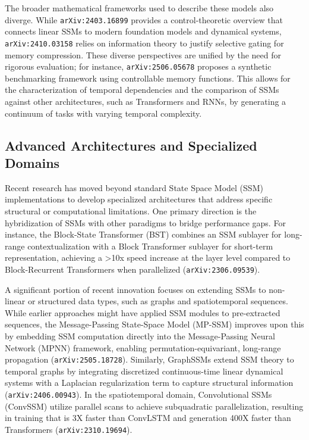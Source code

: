 \documentclass[11pt]{article}
\begin{document}
The broader mathematical frameworks used to describe these models also diverge. While \texttt{arXiv:2403.16899} provides a control-theoretic overview that connects linear SSMs to modern foundation models and dynamical systems, \texttt{arXiv:2410.03158} relies on information theory to justify selective gating for memory compression. These diverse perspectives are unified by the need for rigorous evaluation; for instance, \texttt{arXiv:2506.05678} proposes a synthetic benchmarking framework using controllable memory functions. This allows for the characterization of temporal dependencies and the comparison of SSMs against other architectures, such as Transformers and RNNs, by generating a continuum of tasks with varying temporal complexity.

\subsection{Advanced Architectures and Specialized Domains}

Recent research has moved beyond standard State Space Model (SSM) implementations to develop specialized architectures that address specific structural or computational limitations. One primary direction is the hybridization of SSMs with other paradigms to bridge performance gaps. For instance, the Block-State Transformer (BST) combines an SSM sublayer for long-range contextualization with a Block Transformer sublayer for short-term representation, achieving a >10x speed increase at the layer level compared to Block-Recurrent Transformers when parallelized (\texttt{arXiv:2306.09539}).

A significant portion of recent innovation focuses on extending SSMs to non-linear or structured data types, such as graphs and spatiotemporal sequences. While earlier approaches might have applied SSM modules to pre-extracted sequences, the Message-Passing State-Space Model (MP-SSM) improves upon this by embedding SSM computation directly into the Message-Passing Neural Network (MPNN) framework, enabling permutation-equivariant, long-range propagation (\texttt{arXiv:2505.18728}). Similarly, GraphSSMs extend SSM theory to temporal graphs by integrating discretized continuous-time linear dynamical systems with a Laplacian regularization term to capture structural information (\texttt{arXiv:2406.00943}). In the spatiotemporal domain, Convolutional SSMs (ConvSSM) utilize parallel scans to achieve subquadratic parallelization, resulting in training that is 3X faster than ConvLSTM and generation 400X faster than Transformers (\texttt{arXiv:2310.19694}).
\end{document}
